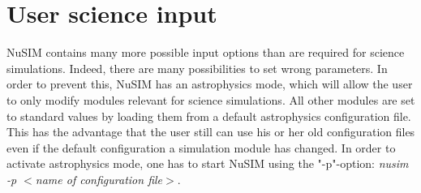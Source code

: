 \documentclass[11pt]{article}
\begin{document}
\section{User science input}

NuSIM contains many more possible input options than are required for science simulations. 
Indeed, there are many possibilities to set wrong parameters.
In order to prevent this, NuSIM has an astrophysics mode, which will allow the user to only modify modules relevant for science simulations.
All other modules are set to standard values by loading them from a default astrophysics configuration file.
This has the advantage that the user still can use his or her old configuration files even if the default configuration a simulation module has changed.
In order to activate astrophysics mode, one has to start NuSIM using the "-p"-option: \emph{nusim -p $<$name of configuration file$>$}. 
\end{document}
